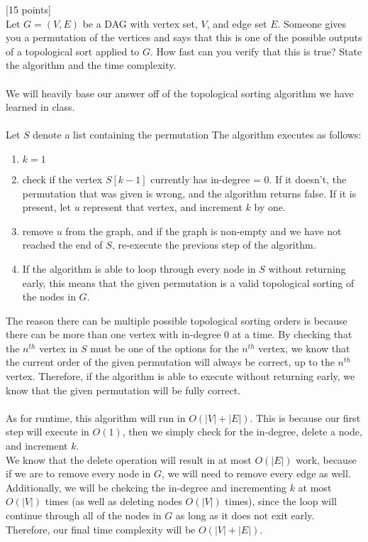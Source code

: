 \documentclass[12pt]{article}
\newcounter{ques}
\newenvironment{question}{\stepcounter{ques}{\noindent\bf Question \arabic{ques}:}}{\vspace{5mm}}
\begin{document}
\begin{question}[15 points]\\

	Let $G =(V,E)$  be a DAG with vertex set,  $V$, and edge set $E$.  Someone gives you a permutation of the vertices and says that this is one of the possible outputs of a topological sort applied to $G$. How fast can you verify that this is true? State the algorithm and the time complexity.\\\\

  We will heavily base our answer off of the topological sorting algorithm we have learned in class.\\\\
  Let $S$ denote a list containing the permutation
  The algorithm executes as follows:
  \begin{enumerate}
    \item $k=1$
    \item check if the vertex $S[k-1]$ currently has in-degree = 0. If it doesn't, the permutation that was given is wrong, and the algorithm returns false. If it is present, let $u$ represent that vertex, and increment $k$ by one.
    \item remove $u$ from the graph, and if the graph is non-empty and we have not reached the end of $S$, re-execute the previous step of the algorithm.
    \item If the algorithm is able to loop through every node in $S$ without returning early, this means that the given permutation is a valid topological sorting of the nodes in $G$.
  \end{enumerate}

  The reason there can be multiple possible topological sorting orders is because there can be more than one vertex with in-degree 0 at a time. By checking that the $n^{th}$ vertex in $S$ must be one of the options for the $n^{th}$ vertex, we know that the current order of the given permutation will always be correct, up to the $n^{th}$ vertex. Therefore, if the algorithm is able to execute without returning early, we know that the given permutation will be fully correct.\\\\

  As for runtime, this algorithm will run in $O(|V| + |E|)$. This is because our first step will execute in $O(1)$, then we simply check for the in-degree, delete a node, and increment $k$. \\
  We know that the delete operation will result in at most $O(|E|)$ work, because if we are to remove every node in $G$, we will need to remove every edge as well. Additionally, we will be chekcing the in-degree and incrementing $k$ at most $O(|V|)$ times (as well as deleting nodes $O(|V|)$ times), since the loop will continue through all of the nodes in $G$ as long as it does not exit early.\\
  Therefore, our final time complexity will be $O(|V| + |E|)$.

	\end{question}
\end{document}
